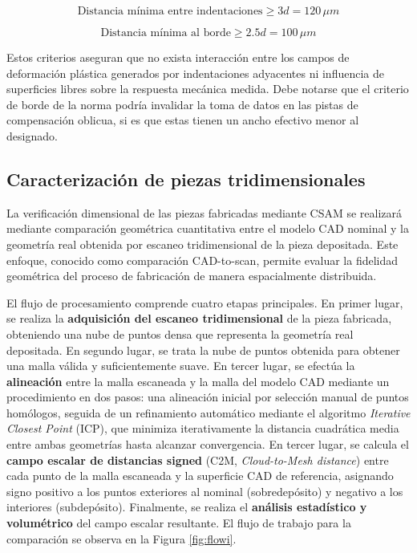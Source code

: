 \begin{equation}
	\text{Distancia mínima entre indentaciones} \geq 3d = 120 \, \mu m
\end{equation}

\begin{equation}
	\text{Distancia mínima al borde} \geq 2.5d = 100 \, \mu m
\end{equation}

Estos criterios aseguran que no exista interacción entre los campos de deformación plástica generados por indentaciones adyacentes ni influencia de superficies libres sobre la respuesta mecánica medida. Debe notarse que el criterio de borde de la norma podría invalidar la toma de datos en las pistas de compensación oblicua, si es que estas tienen un ancho efectivo menor al designado.

\subsection{Caracterización de piezas tridimensionales}

La verificación dimensional de las piezas fabricadas mediante CSAM se realizará mediante
comparación geométrica cuantitativa entre el modelo CAD nominal y la geometría real
obtenida por escaneo tridimensional de la pieza depositada. Este enfoque, conocido como
comparación CAD-to-scan, permite evaluar la fidelidad geométrica del proceso de fabricación
de manera espacialmente distribuida.

El flujo de procesamiento comprende cuatro etapas principales. En primer lugar, se realiza
la \textbf{adquisición del escaneo tridimensional} de la pieza fabricada, obteniendo una nube
de puntos densa que representa la geometría real depositada. En segundo lugar, se trata la nube de puntos obtenida para obtener una malla válida y suficientemente suave. En tercer lugar, se efectúa
la \textbf{alineación} entre la malla escaneada y la malla del modelo CAD mediante un procedimiento en
dos pasos: una alineación inicial por selección manual de puntos homólogos, seguida de un
refinamiento automático mediante el algoritmo \textit{Iterative Closest Point} (ICP), que
minimiza iterativamente la distancia cuadrática media entre ambas geometrías hasta alcanzar
convergencia. En tercer lugar, se calcula el \textbf{campo escalar de distancias signed}
(C2M, \textit{Cloud-to-Mesh distance}) entre cada punto de la malla escaneada y la superficie
CAD de referencia, asignando signo positivo a los puntos exteriores al nominal
(sobredepósito) y negativo a los interiores (subdepósito). Finalmente, se realiza el
\textbf{análisis estadístico y volumétrico} del campo escalar resultante. El flujo de trabajo para la comparación se observa en la Figura \ref{fig:flowi}.

